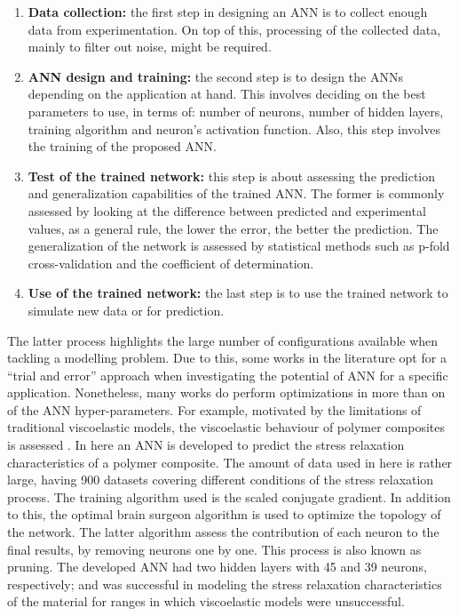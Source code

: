 \begin{enumerate}
    \item \textbf{Data collection:} the first step in designing an ANN is to collect enough data from experimentation. On top of this, processing of the collected data, mainly to filter out noise, might be required.
    \item \textbf{ANN design and training:} the second step is to design the ANNs depending on the application at hand. This involves deciding on the best parameters to use, in terms of: number of neurons, number of hidden layers, training algorithm and neuron's activation function. Also, this step involves the training of the proposed ANN.
    \item \textbf{Test of the trained network:} this step is about assessing the prediction and generalization capabilities of the trained ANN. The former is commonly assessed by looking at the difference between predicted and experimental values, as a general rule, the lower the error, the better the prediction. The generalization of the network is assessed by statistical methods such as p-fold cross-validation and the coefficient of determination.
    \item \textbf{Use of the trained network:} the last step is to use the trained network to simulate new data or for prediction.
\end{enumerate}

The latter process highlights the large number of configurations available when tackling a modelling problem. Due to this, some works in the literature opt for a ``trial and error'' approach when investigating the potential of ANN for a specific application. Nonetheless, many works do perform optimizations in more than on of the ANN hyper-parameters. For example, motivated by the limitations of traditional viscoelastic models, the viscoelastic behaviour of polymer composites is assessed \cite{al2006prediction}. In here an ANN is developed to predict the stress relaxation characteristics of a polymer composite. The amount of data used in here is rather large, having 900 datasets covering different conditions of the stress relaxation process. The training algorithm used is the scaled conjugate gradient. In addition to this, the optimal brain surgeon algorithm is used to optimize the topology of the network. The latter algorithm assess the contribution of each neuron to the final results, by removing neurons one by one. This process is also known as pruning. The developed ANN had two hidden layers with 45 and 39 neurons, respectively; and was successful in modeling the stress relaxation characteristics of the material for ranges in which viscoelastic models were unsuccessful.


